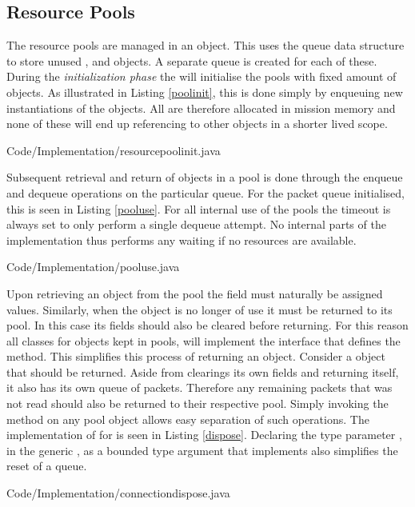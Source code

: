 \subsection{Resource Pools} %
\label{sub:resource_pools}
The resource pools are managed in an  object. This uses the queue data structure to store unused ,  and  objects. A separate queue is created for each of these. During the \textit{initialization phase} the  will initialise the pools with fixed amount of objects. As illustrated in Listing \ref{poolinit}, this is done simply by enqueuing new instantiations of the objects. All are therefore allocated in mission memory and none of these will end up referencing to other objects in a shorter lived scope. 

{Code/Implementation/resourcepoolinit.java}

Subsequent retrieval and return of objects in a pool is done through the enqueue and dequeue operations on the particular queue. For the packet queue initialised, this is seen in Listing \ref{pooluse}. For all internal use of the pools the timeout is always set to only perform a single dequeue attempt. No internal parts of the implementation thus performs any waiting if no resources are available.

{Code/Implementation/pooluse.java}

Upon retrieving an object from the pool the field must naturally be assigned values. Similarly, when the object is no longer of use it must be returned to its pool. In this case its fields should also be cleared before returning. For this reason all classes for objects kept in pools, will implement the  interface that defines the  method. This simplifies this process of returning an object. Consider a  object that should be returned. Aside from clearings its own fields and returning itself, it also has its own queue of packets. Therefore any remaining packets that was not read should also be returned to their respective pool. Simply invoking the  method on any pool object allows easy separation of such operations. The implementation of  for  is seen in Listing \ref{dispose}. Declaring the type parameter , in the generic , as a bounded type argument that implements  also simplifies the reset of a queue.

{Code/Implementation/connectiondispose.java}

